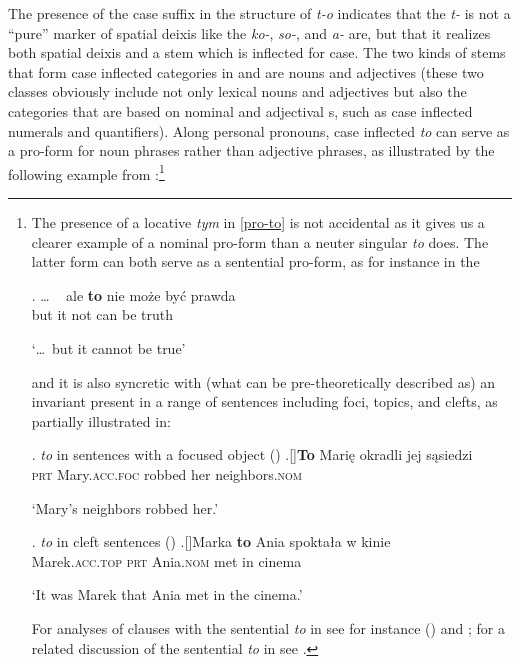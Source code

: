 The presence of the case suffix in the structure of \textit{t-o} indicates that the \textit{t-} is not a ``pure'' marker of spatial deixis like the  \textit{ko-}, \textit{so-}, and \textit{a-} are, but that it realizes both spatial deixis and a stem which is inflected for case. The two kinds of stems that form case inflected categories in  and  are nouns and adjectives (these two classes obviously include not only lexical nouns and adjectives but also the categories that are based on nominal and adjectival s, such as case inflected numerals and quantifiers). Along personal pronouns, case inflected \textit{to} can serve as a pro-form for noun phrases rather than adjective phrases, as illustrated by the following example from :\footnote{The presence of a locative \textit{tym} in \ref{pro-to} is not accidental as it gives us a clearer example of a nominal pro-form than a neuter singular \textit{to} does. The latter form can both serve as a sentential pro-form, as for instance in the  

\noindent\parbox{\linguexfootnotewidth}{\exg. {\ldots} {\ } ale \textbf{to} nie mo\.ze by\'c prawda\\
{} {} but it not can be truth\\
\strut  `\ldots \ but it cannot be true'

} and it is also syncretic with (what can be pre-theoretically described as) an invariant  present in a range of sentences including foci, topics, and clefts, as partially illustrated in:

\noindent\parbox{\linguexfootnotewidth}{\ex.  \textit{to} in sentences with a focused object (\citealt[147]{Wiland2016})
\ag.[]\hspace{-22pt}\textbf{To} Mari\k{e} okradli jej s\k{a}siedzi\\
\hspace{-22pt}\textsc{prt} Mary.\textsc{acc.foc}  robbed her neighbors.\textsc{nom}\\
\hspace{-22pt}\strut `Mary's neighbors robbed her.'

\ex.  \textit{to} in cleft sentences (\citealt[354]{Tajsner2008})
\ag.[]\hspace{-22pt}Marka \textbf{to} Ania spokta\l a w kinie\\
\hspace{-22pt}Marek.\textsc{acc.top} \textsc{prt} Ania.\textsc{nom} met in cinema\\
\hspace{-22pt}\strut `It was Marek that Ania met in the cinema.'  

} For analyses of clauses with the sentential \textit{to} in  see for instance \citeauthor{Tajsner2008} (\citeyear{Tajsner2008,Tajsner2015,Tajsner2018}) and \cite{Mokrosz2014}; for a related discussion of the sentential \textit{to} in  see \cite{Simik2009}.      
} %

